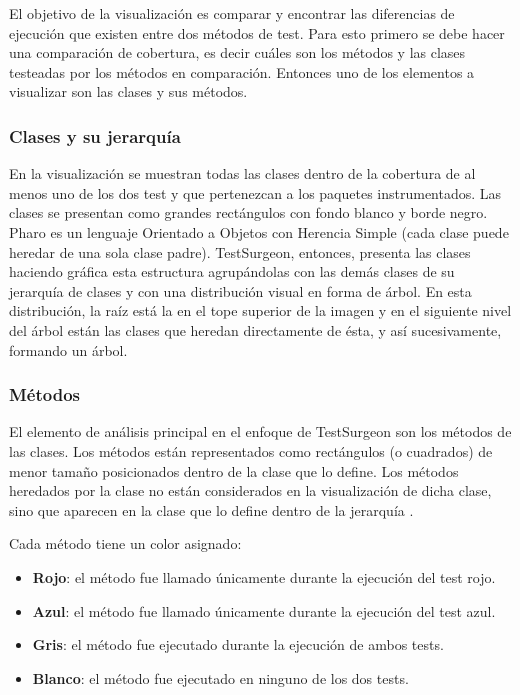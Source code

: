 \par El objetivo de la visualización es comparar y encontrar las diferencias de ejecución que existen entre dos métodos de test. Para esto primero se debe hacer una comparación de cobertura, es decir cuáles son los métodos y las clases testeadas por los métodos en comparación. Entonces uno de los elementos a visualizar son las clases y sus métodos. 

\subsubsection{Clases y su jerarquía}

\par En la visualización se muestran todas las clases dentro de la cobertura de al menos uno de los dos test y que pertenezcan a los paquetes instrumentados. Las clases se presentan como grandes rectángulos con fondo blanco y borde negro. Pharo es un lenguaje Orientado a Objetos con Herencia Simple (cada clase puede heredar de una sola clase padre). TestSurgeon, entonces, presenta las clases haciendo gráfica esta estructura agrupándolas con las demás clases de su jerarquía de clases y con una distribución visual en forma de árbol. En esta distribución, la raíz está la en el tope superior de la imagen y en el siguiente nivel del árbol están las clases que heredan directamente de ésta, y así sucesivamente, formando un árbol.


\subsubsection{Métodos}

\par El elemento de análisis principal en el enfoque de TestSurgeon son los métodos de las clases. Los métodos están representados como rectángulos (o cuadrados) de menor tamaño posicionados dentro de la clase que lo define.  Los métodos heredados por la clase no están considerados en la visualización de dicha clase, sino que aparecen en la clase que lo define dentro de la jerarquía
.  

\par Cada método tiene un color asignado:
\begin{itemize}
\item {\bf Rojo}: el método fue llamado únicamente durante la ejecución del test rojo.
\item {\bf Azul}: el método fue llamado únicamente durante la ejecución del test azul.
\item {\bf Gris}: el método fue ejecutado durante la ejecución de ambos tests.
\item {\bf Blanco}: el método fue ejecutado en ninguno de los dos tests.
\end{itemize}

